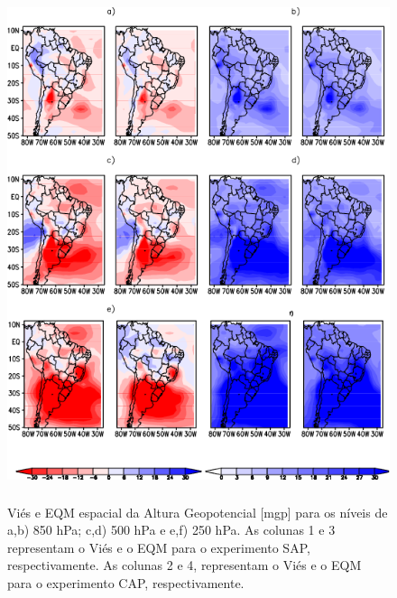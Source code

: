 \begin{figure}[!hbp]
\centering
\includegraphics[height=15cm]{./figs/campo_vies_eqm-zgeo.png}
\caption{Viés e EQM espacial da Altura Geopotencial [mgp] para os níveis de a,b) 850 hPa; c,d) 500 hPa e e,f) 250 hPa. As colunas 1 e 3 representam o Viés e o EQM para o experimento SAP, respectivamente. As colunas 2 e 4, representam o Viés e o EQM para o experimento CAP, respectivamente.}
\label{fig48}
\end{figure}

